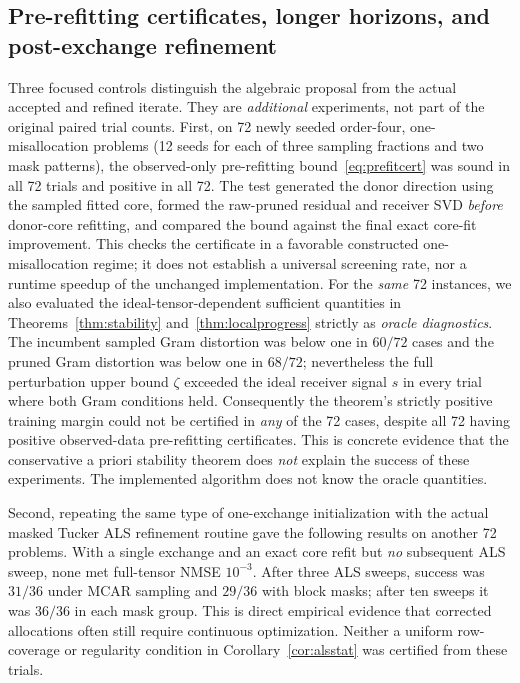 \documentclass[review,10pt]{elsarticle}
\begin{document}
\subsection{Pre-refitting certificates, longer horizons, and post-exchange refinement}\label{subsec:newcontrols}
Three focused controls distinguish the algebraic proposal from the actual accepted and refined iterate. They are \emph{additional} experiments, not part of the original paired trial counts. First, on 72 newly seeded order-four, one-misallocation problems (12 seeds for each of three sampling fractions and two mask patterns), the observed-only pre-refitting bound~\eqref{eq:prefitcert} was sound in all 72 trials and positive in all 72. The test generated the donor direction using the sampled fitted core, formed the raw-pruned residual and receiver SVD \emph{before} donor-core refitting, and compared the bound against the final exact core-fit improvement. This checks the certificate in a favorable constructed one-misallocation regime; it does not establish a universal screening rate, nor a runtime speedup of the unchanged implementation. For the \emph{same} 72 instances, we also evaluated the ideal-tensor-dependent sufficient quantities in Theorems~\ref{thm:stability} and~\ref{thm:localprogress} strictly as \emph{oracle diagnostics}. The incumbent sampled Gram distortion was below one in $60/72$ cases and the pruned Gram distortion was below one in $68/72$; nevertheless the full perturbation upper bound $\zeta$ exceeded the ideal receiver signal $s$ in every trial where both Gram conditions held. Consequently the theorem's strictly positive training margin could not be certified in \emph{any} of the 72 cases, despite all 72 having positive observed-data pre-refitting certificates. This is concrete evidence that the conservative a priori stability theorem does \emph{not} explain the success of these experiments. The implemented algorithm does not know the oracle quantities.

Second, repeating the same type of one-exchange initialization with the actual masked Tucker ALS refinement routine gave the following results on another 72 problems. With a single exchange and an exact core refit but \emph{no} subsequent ALS sweep, none met full-tensor NMSE $10^{-3}$. After three ALS sweeps, success was $31/36$ under MCAR sampling and $29/36$ with block masks; after ten sweeps it was $36/36$ in each mask group. This is direct empirical evidence that corrected allocations often still require continuous optimization. Neither a uniform row-coverage or regularity condition in Corollary~\ref{cor:alsstat} was certified from these trials.
\end{document}
